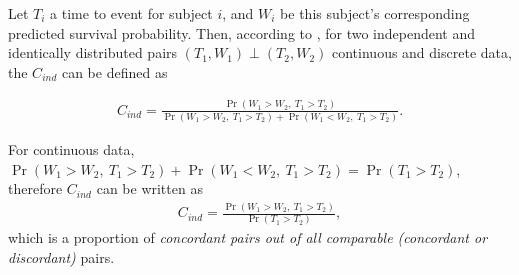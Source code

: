 \documentclass[]{article}\usepackage[]{graphicx}\usepackage[]{color}
\begin{document}
Let $T_i$ a time to event for subject $i$, and $W_i$ be this subject's corresponding predicted survival probability. Then, according to \cite{pencina2004overall}, for two independent and identically distributed pairs $(T_1, W_1) \perp (T_2, W_2)$ continuous and discrete data, the $C_{ind}$ can be defined as

\begin{linenomath}
  \begin{align}
  \label{defineC}
 C_{ind} = \frac{\Pr(W_1 > W_2,~ T_1 > T_2)}{\Pr(W_1 > W_2,~ T_1 > T_2) + \Pr(W_1 < W_2,~ T_1 > T_2)}.
\end{align}
\end{linenomath}

For continuous data, $\Pr(W_1 > W_2,~ T_1 > T_2) + \Pr(W_1 < W_2,~ T_1 > T_2) = \Pr(T_1 > T_2)$, therefore $C_{ind}$ can be written as
\begin{align}
  \label{defineCCont}
 C_{ind} = \frac{\Pr(W_1 > W_2,~ T_1 > T_2)}{\Pr(T_1 > T_2)},
\end{align}
which is a proportion of \emph{concordant pairs out of all comparable (concordant or discordant)} pairs.\\
\end{document}
